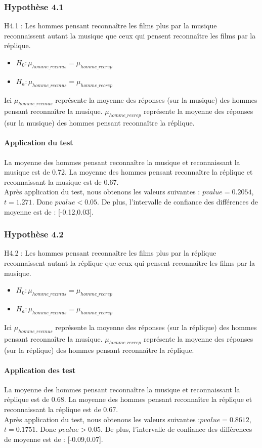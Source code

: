 \documentclass{article} %
\begin{document}
\subsubsection{Hypothèse 4.1}
H4.1 : Les hommes pensant reconnaître les films plus par la musique reconnaissent autant la musique que ceux qui pensent reconnaître les films par la réplique.
\begin{itemize}
	\item $H_0: \mu_{homme\_recmus} = \mu_{homme\_recrep} $
	\item $H_a: \mu_{homme\_recmus} = \mu_{homme\_recrep} $
\end{itemize}

Ici $\mu_{homme\_recmus}$ représente la moyenne des réponses (sur la musique) des hommes pensant reconnaître la musique. $\mu_{homme\_recrep}$ représente la moyenne des réponses (sur la musique) des hommes pensant reconnaître la réplique.
\paragraph{Application du test\\}
La moyenne des hommes pensant reconnaître la musique et reconnaissant la musique est de 0.72. La moyenne des hommes pensant reconnaître la réplique et reconnaissant la musique est de 0.67.\\
Après application du test, nous obtenons les valeurs suivantes : $pvalue = 0.2054$, $t = 1.271$. Donc ${pvalue<0.05}$. De plus, l'intervalle de confiance des différences de moyenne est de : [-0.12,0.03].
\subsubsection{Hypothèse 4.2}
H4.2 : Les hommes pensant reconnaître les films plus par la réplique reconnaissent autant la réplique que ceux qui pensent reconnaître les films par la musique.
\begin{itemize}
	\item $H_0: \mu_{homme\_recmus} = \mu_{homme\_recrep} $
	\item $H_a: \mu_{homme\_recmus} = \mu_{homme\_recrep} $
\end{itemize}
Ici $\mu_{homme\_recmus}$ représente la moyenne des réponses (sur la réplique) des hommes pensant reconnaître la musique.  $\mu_{homme\_recrep}$ représente la moyenne des réponses (sur la réplique) des hommes pensant reconnaître la réplique.
\paragraph{ Application des test}
La moyenne des hommes pensant reconnaître la musique et reconnaissant la réplique est de 0.68.
La moyenne des hommes pensant reconnaître la réplique et reconnaissant la réplique est de 0.67.\\
Après application du test, nous obtenons les valeurs suivantes :$pvalue = 0.8612$, $t = 0.1751$. Donc ${pvalue>0.05}$. De plus, l'intervalle de confiance des différences de moyenne est de :  [-0.09,0.07].
\end{document}
